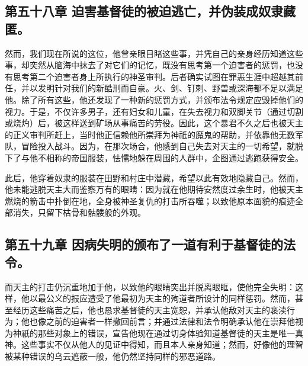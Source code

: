 
\subsection{第五十八章 迫害基督徒的被迫逃亡，并伪装成奴隶藏匿。}

然而，我们现在所说的这位，他曾亲眼目睹这些事，并凭自己的亲身经历知道这些事，却突然从脑海中抹去了对它们的记忆，既没有思考第一个迫害者的惩罚，也没有思考第二个迫害者身上所执行的神圣审判。后者确实试图在罪恶生涯中超越其前任，并以发明针对我们的新酷刑而自豪。火、剑、钉刺、野兽或深海都不足以满足他。除了所有这些，他还发现了一种新的惩罚方式，并颁布法令规定应毁掉他们的视力。于是，不仅许多男子，还有妇女和儿童，在失去视力和双脚关节（通过切割或烧灼）后，被这样送到矿场从事痛苦的劳役。因此，这个暴君不久之后也被天主的正义审判所赶上，当时他正信赖他所崇拜为神祇的魔鬼的帮助，并依靠他无数军队，冒险投入战斗。因为，在那次场合，他感到自己失去对天主的一切希望，就脱下了与他不相称的帝国服装，怯懦地躲在周围的人群中，企图通过逃跑获得安全。\par

此后，他穿着奴隶的服装在田野和村庄中潜藏，希望以此有效地隐藏自己。然而，他未能逃脱天主大而鉴察万有的眼睛：因为就在他期待安然度过余生时，他被天主燃烧的箭击中扑倒在地，全身被神圣复仇的打击所吞噬；以致他原本面貌的痕迹全部消失，只留下枯骨和骷髅般的外观。\par


\subsection{第五十九章 因病失明的颁布了一道有利于基督徒的法令。}

而天主的打击仍沉重地加于他，以致他的眼睛突出并脱离眼眶，使他完全失明：这样，他以最公义的报应遭受了他最初为天主的殉道者所设计的同样惩罚。然而，甚至经历这些痛苦之后，他也恳求基督徒的天主宽恕，并承认他敌对天主的亵渎行为；他也像之前的迫害者一样撤回前言；并通过法律和法令明确承认他在崇拜他视为神祇的那些对象上的错误，宣告他现在通过切身体验知道基督徒的天主是唯一真神。这些事实不仅从他人的见证中得知，而且本人亲身知道；然而，好像他的理智被某种错误的乌云遮蔽一般，他仍然坚持同样的邪恶道路。\par


